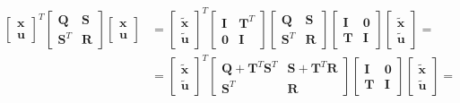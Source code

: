 \documentclass[letterpaper,10pt,english]{jupyterBook}
\begin{document}
\begin{equation*}
\begin{split}\begin{aligned}
  \begin{bmatrix} \mathbf{x} \\ \mathbf{u} \end{bmatrix}^T \begin{bmatrix} \mathbf{Q} & \mathbf{S} \\ \mathbf{S}^T & \mathbf{R} \end{bmatrix} \begin{bmatrix} \mathbf{x} \\ \mathbf{u} \end{bmatrix}
  & = \begin{bmatrix} \widetilde{\mathbf{x}} \\ \widetilde{\mathbf{u}} \end{bmatrix}^T \begin{bmatrix} \mathbf{I} & \mathbf{T}^T \\ \mathbf{0} & \mathbf{I} \end{bmatrix} \begin{bmatrix} \mathbf{Q} & \mathbf{S} \\ \mathbf{S}^T & \mathbf{R} \end{bmatrix} \begin{bmatrix} \mathbf{I} & \mathbf{0} \\ \mathbf{T} & \mathbf{I} \end{bmatrix}  \begin{bmatrix} \widetilde{\mathbf{x}} \\ \widetilde{\mathbf{u}} \end{bmatrix} = \\
  & = \begin{bmatrix} \widetilde{\mathbf{x}} \\ \widetilde{\mathbf{u}} \end{bmatrix}^T \begin{bmatrix} \mathbf{Q} + \mathbf{T}^T \mathbf{S}^T & \mathbf{S} + \mathbf{T}^T \mathbf{R} \\ \mathbf{S}^T & \mathbf{R} \end{bmatrix} \begin{bmatrix} \mathbf{I} & \mathbf{0} \\ \mathbf{T} & \mathbf{I} \end{bmatrix}  \begin{bmatrix} \widetilde{\mathbf{x}} \\ \widetilde{\mathbf{u}} \end{bmatrix} = \\ 

\end{aligned}
\end{split}
\end{equation*}
\end{document}
